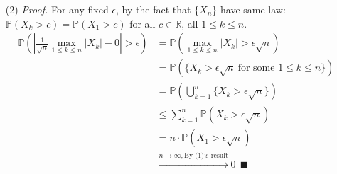 \documentclass[a4paper,12pt,twoside]{book}
\begin{document}
\begin{itemize}
	\item[(2)]\textit{Proof.} For any fixed $\epsilon$, by the fact that $\{X_n\}$ have same law: $\mathbb{P}\left(X_k>c\right)=\mathbb{P}\left(X_1>c\right)$ for all $c\in \mathbb{R}$, all $1\leq k\leq n$.
	\begin{equation}
		\begin{split}
			\mathbb{P}\left(\left|\frac{1}{\sqrt{n}}\max\limits_{1\leq k\leq n}|X_k|-0\right|>\epsilon\right)
			&=\mathbb{P}\left(\max\limits_{1\leq k\leq n}|X_k|>\epsilon\sqrt{n}\right)\\
			&=\mathbb{P}\left(\{X_k>\epsilon\sqrt{n}~\text{for some }1\leq k\leq n\}\right)\\
			&=\mathbb{P}\left(\bigcup_{k=1}^{n}\{X_k>\epsilon\sqrt{n}\}\right)\\
			&\leq \sum_{k=1}^n \mathbb{P}\left(X_k>\epsilon\sqrt{n}\right)\\
			&= n\cdot \mathbb{P}\left(X_1>\epsilon\sqrt{n}\right) \\
			&\xrightarrow{n\to \infty,\text{By (1)'s result}}0~~\blacksquare
		\end{split}
	\end{equation}
\end{itemize}
\end{document}
